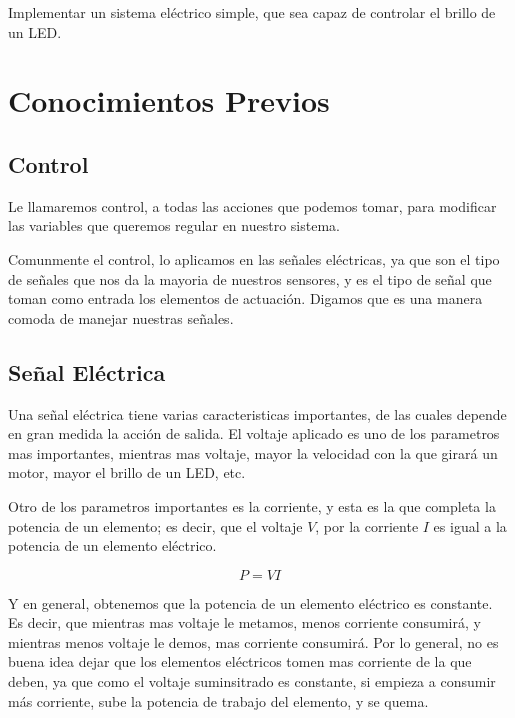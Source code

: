 	Implementar un sistema eléctrico simple, que sea capaz de controlar el brillo de un LED.


\section{Conocimientos Previos}


	\subsection{Control}

		Le llamaremos control, a todas las acciones que podemos tomar, para modificar las variables que queremos regular en nuestro sistema.

		Comunmente el control, lo aplicamos en las señales eléctricas, ya que son el tipo de señales que nos da la mayoria de nuestros sensores, y es el tipo de señal que toman como entrada los elementos de actuación. Digamos que es una manera comoda de manejar nuestras señales.


	\subsection{Señal Eléctrica}

		Una señal eléctrica tiene varias caracteristicas importantes, de las cuales depende en gran medida la acción de salida. El voltaje aplicado es uno de los parametros mas importantes, mientras mas voltaje, mayor la velocidad con la que girará un motor, mayor el brillo de un LED, etc.

		Otro de los parametros importantes es la corriente, y esta es la que completa la potencia de un elemento; es decir, que el voltaje $V$, por la corriente $I$ es igual a la potencia de un elemento eléctrico.

		\begin{equation}
			P = V I
		\end{equation}

		Y en general, obtenemos que la potencia de un elemento eléctrico es constante. Es decir, que mientras mas voltaje le metamos, menos corriente consumirá, y mientras menos voltaje le demos, mas corriente consumirá. Por lo general, no es buena idea dejar que los elementos eléctricos tomen mas corriente de la que deben, ya que como el voltaje suminsitrado es constante, si empieza a consumir más corriente, sube la potencia de trabajo del elemento, y se quema.

